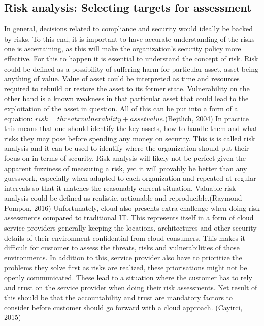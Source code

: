 \documentclass{article}
\begin{document}
\subsection{Risk analysis: Selecting targets for assessment}
In general, decisions related to compliance and security would ideally be backed by risks. To this end, it is important to have accurate understanding of the risks one is ascertaining, as this will make the organization's security policy more effective.
For this to happen it is essential to understand the concept of risk. Risk could be defined as a possibility of suffering harm for particular asset, asset being anything of value. Value of asset could be interpreted as time and resources required to rebuild or restore the asset to its former state. Vulnerability on the other hand is a known weakness in that particular asset that could lead to the exploitation of the asset in question. All of this can be put into a form of a equation: $risk = threat x vulnerability + asset value$.(Bejtlich, 2004)
In practice this means that one should identify the key assets, how to handle them and what risks they may pose before spending any money on security. This is is called risk analysis and it can be used to identify where the organization should put their focus on in terms of security. Risk analysis will likely not be perfect given the apparent fuzziness of measuring a risk, yet it will provably be better than any guesswork, especially when adapted to each organization and repeated at regular intervals so that it matches the reasonably current situation. Valuable risk analysis could be defined as realistic, actionable and reproducible.(Raymond Pompon, 2016)
Unfortunately, cloud also presents extra challenge when doing risk assessments compared to traditional IT. This represents itself in a form of cloud service providers generally keeping the locations, architectures and other security details of their environment confidential from cloud consumers. This makes it difficult for customer to assess the threats, risks and vulnerabilities of those environments. In addition to this, service provider also have to prioritize the problems they solve first as risks are realized, these priorisations might not be openly communicated. These lead to a situation where the customer has to rely and trust on the service provider when doing their risk assessments. Net result of this should be that the accountability and trust are mandatory factors to consider before customer should go forward with a cloud approach. (Cayirci, 2015)
\par
\end{document}
